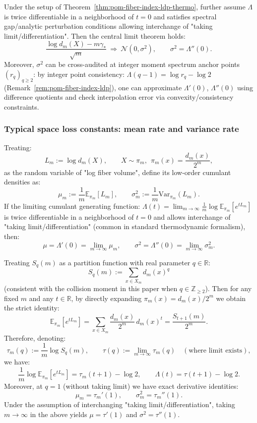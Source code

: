 \begin{theorem}\label{thm:pom-fiber-index-clt-thermo}
Under the setup of Theorem~\ref{thm:pom-fiber-index-ldp-thermo}, further assume $\Lambda$ is twice differentiable in a neighborhood of $t=0$ and satisfies spectral gap/analytic perturbation conditions allowing interchange of "taking limit/differentiation".
Then the central limit theorem holds:
\[
\frac{\log d_m(X)-m\gamma_\ast}{\sqrt m}\ \Longrightarrow\ \mathcal N(0,\sigma^2),
\qquad
\sigma^2=\Lambda''(0).
\]
Moreover, $\sigma^2$ can be cross-audited at integer moment spectrum anchor points $(r_q)_{q\ge 2}$: by integer point consistency:
\(
\Lambda(q-1)=\log r_q-\log 2
\)
(Remark~\ref{rem:pom-fiber-index-ldp}), one can approximate $\Lambda'(0)$, $\Lambda''(0)$ using difference quotients and check interpolation error via convexity/consistency constraints.
\end{theorem}

\subsubsection{Typical space loss constants: mean rate and variance rate}\label{subsec:pom-fiber-log-moments}
Treating:
\[
L_m:=\log d_m(X),\qquad X\sim \pi_m,\ \ \pi_m(x)=\frac{d_m(x)}{2^m},
\]
as the random variable of "log fiber volume", define its low-order cumulant densities as:
\[
\mu_m:=\frac{1}{m}\mathbb{E}_{\pi_m}[L_m],
\qquad
\sigma_m^2:=\frac{1}{m}\mathrm{Var}_{\pi_m}(L_m).
\]
If the limiting cumulant generating function:
\(
\Lambda(t)=\lim_{m\to\infty}\frac{1}{m}\log \mathbb{E}_{\pi_m}[e^{tL_m}]
\)
is twice differentiable in a neighborhood of $t=0$ and allows interchange of "taking limit/differentiation" (common in standard thermodynamic formalism), then:
\[
\mu=\Lambda'(0)=\lim_{m\to\infty}\mu_m,\qquad
\sigma^2=\Lambda''(0)=\lim_{m\to\infty}\sigma_m^2.
\]
\begin{remark}[Collision spectrum \texorpdfstring{$\leftrightarrow$}{<->} typical loss: \texorpdfstring{$\Lambda(t)=\tau(t+1)-\log2$}{Lambda(t)=tau(t+1)-log2}]\label{rem:pom-lambda-tau-shift}
Treating $S_q(m)$ as a partition function with real parameter $q\in\mathbb{R}$:
\[
S_q(m):=\sum_{x\in X_m} d_m(x)^q
\]
(consistent with the collision moment in this paper when $q\in\mathbb{Z}_{\ge 2}$).
Then for any fixed $m$ and any $t\in\mathbb{R}$, by directly expanding $\pi_m(x)=d_m(x)/2^m$ we obtain the strict identity:
\[
\mathbb{E}_{\pi_m}[e^{tL_m}]
=\sum_{x\in X_m}\frac{d_m(x)}{2^m}\,d_m(x)^t
=\frac{S_{t+1}(m)}{2^m}.
\]
Therefore, denoting:
\[
\tau_m(q):=\frac1m\log S_q(m),
\qquad
\tau(q):=\lim_{m\to\infty}\tau_m(q)\quad(\text{where limit exists}),
\]
we have:
\[
\frac1m\log \mathbb{E}_{\pi_m}[e^{tL_m}]=\tau_m(t+1)-\log2,
\qquad
\Lambda(t)=\tau(t+1)-\log2.
\]
Moreover, at $q=1$ (without taking limit) we have exact derivative identities:
\[
\mu_m=\tau_m'(1),
\qquad
\sigma_m^2=\tau_m''(1).
\]
Under the assumption of interchanging "taking limit/differentiation", taking $m\to\infty$ in the above yields $\mu=\tau'(1)$ and $\sigma^2=\tau''(1)$.
\end{remark}

